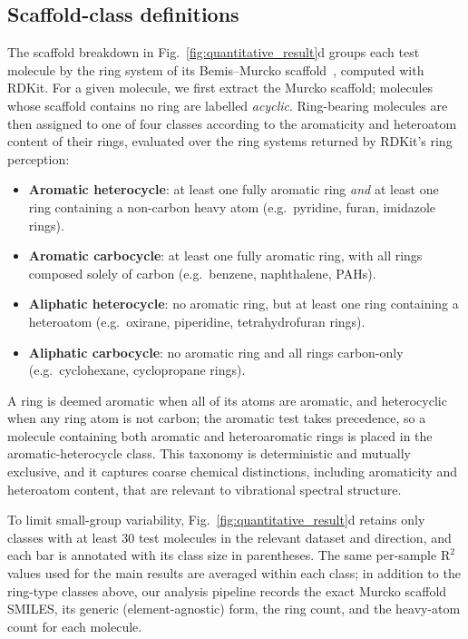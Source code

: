 \documentclass[pdflatex,sn-mathphys-num]{sn-jnl}%
\theoremstyle{thmstyleone}%
\theoremstyle{thmstyletwo}%
\theoremstyle{thmstylethree}%
\begin{document}
\begin{appendices}
\section{Scaffold-class definitions}\label{app:scaffold}
The scaffold breakdown in Fig.~\ref{fig:quantitative_result}d groups each test molecule by the ring system of its Bemis--Murcko scaffold~\citep{bemis1996properties}, computed with RDKit. For a given molecule, we first extract the Murcko scaffold; molecules whose scaffold contains no ring are labelled \emph{acyclic}. Ring-bearing molecules are then assigned to one of four classes according to the aromaticity and heteroatom content of their rings, evaluated over the ring systems returned by RDKit's ring perception:
\begin{itemize}
\item \textbf{Aromatic heterocycle}: at least one fully aromatic ring \emph{and} at least one ring containing a non-carbon heavy atom (e.g.\ pyridine, furan, imidazole rings).
\item \textbf{Aromatic carbocycle}: at least one fully aromatic ring, with all rings composed solely of carbon (e.g.\ benzene, naphthalene, PAHs).
\item \textbf{Aliphatic heterocycle}: no aromatic ring, but at least one ring containing a heteroatom (e.g.\ oxirane, piperidine, tetrahydrofuran rings).
\item \textbf{Aliphatic carbocycle}: no aromatic ring and all rings carbon-only (e.g.\ cyclohexane, cyclopropane rings).
\end{itemize}
A ring is deemed aromatic when all of its atoms are aromatic, and heterocyclic when any ring atom is not carbon; the aromatic test takes precedence, so a molecule containing both aromatic and heteroaromatic rings is placed in the aromatic-heterocycle class. This taxonomy is deterministic and mutually exclusive, and it captures coarse chemical distinctions, including aromaticity and heteroatom content, that are relevant to vibrational spectral structure.

To limit small-group variability, Fig.~\ref{fig:quantitative_result}d retains only classes with at least $30$ test molecules in the relevant dataset and direction, and each bar is annotated with its class size in parentheses. The same per-sample $\text{R}^2$ values used for the main results are averaged within each class; in addition to the ring-type classes above, our analysis pipeline records the exact Murcko scaffold SMILES, its generic (element-agnostic) form, the ring count, and the heavy-atom count for each molecule.

\end{appendices}
\end{document}
